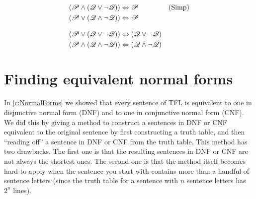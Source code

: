 \begin{table}
\begin{align*}
(\mathscr{P} \land (\mathscr{Q} \lor \lnot\mathscr{Q})) & \Leftrightarrow \mathscr{P}  && \text{(Simp)}\\
(\mathscr{P} \lor (\mathscr{Q} \land \lnot\mathscr{Q})) & \Leftrightarrow \mathscr{P}\\[2ex]
(\mathscr{P} \lor (\mathscr{Q} \lor \lnot\mathscr{Q})) & \Leftrightarrow (\mathscr{Q} \lor \lnot\mathscr{Q}) \\
(\mathscr{P} \land (\mathscr{Q} \land \lnot\mathscr{Q})) & \Leftrightarrow (\mathscr{Q} \land \lnot\mathscr{Q})
\end{align*}
\caption{Basic equivalences}
\label{tab:equivalences}
\end{table}

\section{Finding equivalent normal forms}

In \cref{c:NormalForms} we showed that every sentence of TFL is equivalent to one in disjunctive normal form (DNF) and to one in conjunctive normal form (CNF).  We did this by giving a method to construct a sentences in DNF or CNF equivalent to the original sentence by first constructing a truth table, and then ``reading off'' a sentence in DNF or CNF from the truth table.  This method has two drawbacks. The first one is that the resulting sentences in DNF or CNF are not always the shortest ones.  The second one is that the method itself becomes hard to apply when the sentence you start with contains more than a handful of sentence letters (since the truth table for a sentence with $n$ sentence letters has $2^n$ lines).

